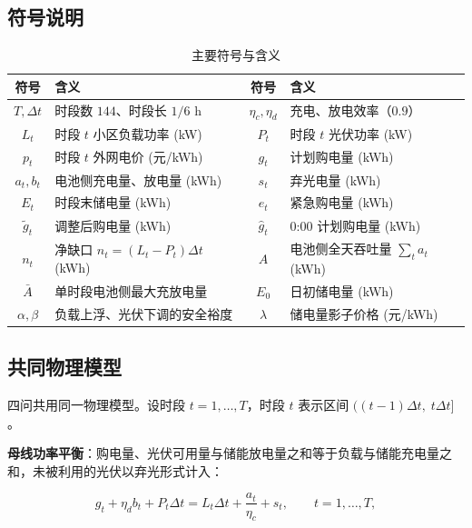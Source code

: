 \subsection{符号说明}

\begin{table}[H]
  \centering
  \caption{主要符号与含义}
  \label{tab:symbols}
  \small
  \begin{tabular}{clcl}
    \toprule[1.5pt]
    符号 & 含义 & 符号 & 含义 \\
    \midrule[1pt]
    $T,\Delta t$ & 时段数 $144$、时段长 $1/6$ \si{h} & $\eta_c,\eta_d$ & 充电、放电效率（$0.9$） \\
    $L_t$ & 时段 $t$ 小区负载功率 (\si{kW}) & $P_t$ & 时段 $t$ 光伏功率 (\si{kW}) \\
    $p_t$ & 时段 $t$ 外网电价 (元/kWh) & $g_t$ & 计划购电量 (\si{kWh}) \\
    $a_t,b_t$ & 电池侧充电量、放电量 (\si{kWh}) & $s_t$ & 弃光电量 (\si{kWh}) \\
    $E_t$ & 时段末储电量 (\si{kWh}) & $e_t$ & 紧急购电量 (\si{kWh}) \\
    $\tilde{g}_t$ & 调整后购电量 (\si{kWh}) & $\hat{g}_t$ & 0:00 计划购电量 (\si{kWh}) \\
    $n_t$ & 净缺口 $n_t=(L_t-P_t)\Delta t$ (\si{kWh}) & $A$ & 电池侧全天吞吐量 $\sum_t a_t$ (\si{kWh}) \\
    $\bar A$ & 单时段电池侧最大充放电量 & $E_0$ & 日初储电量 (\si{kWh}) \\
    $\alpha,\beta$ & 负载上浮、光伏下调的安全裕度 & $\lambda$ & 储电量影子价格 (元/kWh) \\
    \bottomrule[1.5pt]
  \end{tabular}
\end{table}

\subsection{共同物理模型}

四问共用同一物理模型\cite{jiang2018}。设时段 $t=1,\dots,T$，时段 $t$ 表示区间 $((t-1)\Delta t,\;t\Delta t]$。

\textbf{母线功率平衡}：购电量、光伏可用量与储能放电量之和等于负载与储能充电量之和，未被利用的光伏以弃光形式计入：

\begin{equation}
  g_t+\eta_d b_t+P_t\Delta t=L_t\Delta t+\frac{a_t}{\eta_c}+s_t,\qquad t=1,\dots,T,
  \label{eq:balance}
\end{equation}

